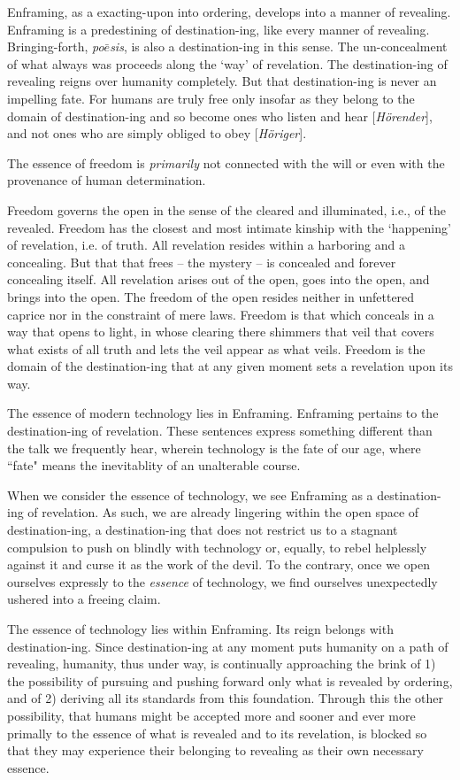 \documentclass[paper=a4, fontsize=11pt,twoside]{scrartcl}
\begin{document}
Enframing, as a exacting-upon into ordering, develops into a manner of revealing. Enframing is a predestining of destination-ing, like every manner of revealing. Bringing-forth, \textit{po$\bar{e}$sis}, is also a destination-ing in this sense. The un-concealment of what always was proceeds along the `way' of revelation. The destination-ing of revealing reigns over humanity completely. But that destination-ing is never an impelling fate. For humans are truly free only insofar as they belong to the domain of destination-ing and so become ones who listen and hear [\textit{H{\"o}render}], and not ones who are simply obliged to obey [\textit{H{\"o}riger}].

The essence of freedom is \textit{primarily} not connected with the will or even with the provenance of human determination.

Freedom governs the open in the sense of the cleared and illuminated, i.e., of the revealed. Freedom has the closest and most intimate kinship with the `happening' of revelation, i.e. of truth. All revelation resides within a harboring and a concealing. But that that frees -- the mystery -- is concealed and forever concealing itself. All revelation arises out of the open, goes into the open, and brings into the open. The freedom of the open resides neither in unfettered caprice nor in the constraint of mere laws. Freedom is that which conceals in a way that opens to light, in whose clearing there shimmers that veil that covers what exists of all truth and lets the veil appear as what veils. Freedom is the domain of the destination-ing that at any given moment sets a revelation upon its way.

The essence of modern technology lies in Enframing. Enframing pertains to the destination-ing of revelation. These sentences express something different than the talk we frequently hear, wherein technology is the fate of our age, where ``fate" means the inevitablity of an unalterable course.

When we consider the essence of technology, we see Enframing as a destination-ing of revelation. As such, we are already lingering within the open space of destination-ing, a destination-ing that does not restrict us to a stagnant compulsion to push on blindly with technology or, equally, to rebel helplessly against it and curse it as the work of the devil. To the contrary, once we open ourselves expressly to the \textit{essence} of technology, we find ourselves unexpectedly ushered into a freeing claim.

The essence of technology lies within Enframing. Its reign belongs with destination-ing. Since destination-ing at any moment puts humanity on a path of revealing, humanity, thus under way, is continually approaching the brink of 1) the possibility of pursuing and pushing forward only what is revealed by ordering, and of 2) deriving all its standards from this foundation. Through this the other possibility, that humans might be accepted more and sooner and ever more primally to the essence of what is revealed and to its revelation, is blocked so that they may experience their belonging to revealing as their own necessary essence.
\end{document}
